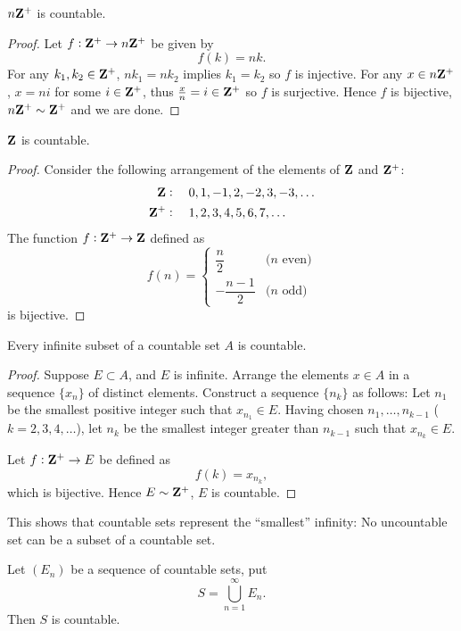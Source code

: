 \begin{proposition}
$n\mathbf Z^+$ is countable.
\end{proposition}

\begin{proof}
Let $f:\mathbf Z^+\to n\mathbf Z^+$ be given by 
\[f(k)=nk.\]
For any $k_1,k_2\in\mathbf Z^+$, $nk_1=nk_2$ implies $k_1=k_2$ so $f$ is injective. For any $x\in n\mathbf Z^+$, $x=ni$ for some $i\in\mathbf Z^+$, thus $\frac{x}{n}=i\in\mathbf Z^+$ so $f$ is surjective. Hence $f$ is bijective, $n\mathbf Z^+\sim\mathbf Z^+$ and we are done.
\end{proof}

\begin{proposition}
$\mathbf Z$ is countable.
\end{proposition}

\begin{proof}
Consider the following arrangement of the elements of $\mathbf Z$ and $\mathbf Z^+$:
\begin{align*}
\mathbf Z&:\quad0,1,-1,2,-2,3,-3,\dots\\
\mathbf Z^+&:\quad1,2,3,4,5,6,7,\dots
\end{align*}
The function $f:\mathbf Z^+\to\mathbf Z$ defined as
\[f(n)=\begin{cases}
\dfrac{n}{2}&\text{($n$ even)}\\[1ex]
-\dfrac{n-1}{2}&\text{($n$ odd)}
\end{cases}\]
is bijective.
\end{proof}

\begin{proposition}
Every infinite subset of a countable set $A$ is countable.
\end{proposition}

\begin{proof}
Suppose $E\subset A$, and $E$ is infinite. Arrange the elements $x\in A$ in a sequence $\{x_n\}$ of distinct elements. Construct a sequence $\{n_k\}$ as follows: Let $n_1$ be the smallest positive integer such that $x_{n_1}\in E$. Having chosen $n_1,\dots,n_{k-1}$ ($k=2,3,4,\dots$), let $n_k$ be the smallest integer greater than $n_{k-1}$ such that $x_{n_k}\in E$.

Let $f:\mathbf Z^+\to E$ be defined as
\[f(k)=x_{n_k},\]
which is bijective. Hence $E\sim\mathbf Z^+$, $E$ is countable.
\end{proof}

This shows that countable sets represent the ``smallest'' infinity: No uncountable set can be a subset of a countable set.

\begin{proposition}
Let $(E_n)$ be a sequence of countable sets, put
\[S=\bigcup_{n=1}^\infty E_n.\]
Then $S$ is countable.
\end{proposition}

